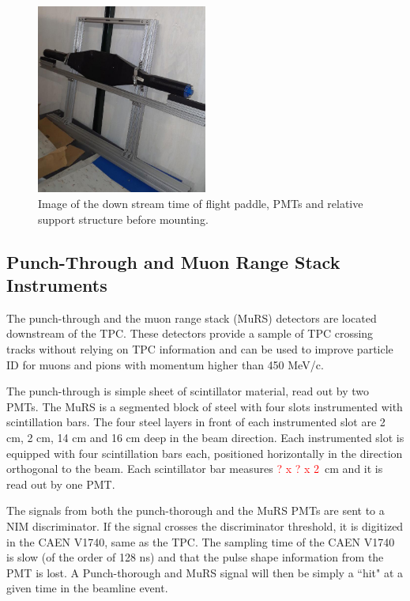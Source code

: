 \begin{figure}[h!]
\centering
\includegraphics[width=0.5\textwidth]{Chapter-3/Images/DSTOF.jpg}
\caption{Image of the down stream time of flight paddle, PMTs and relative support structure before mounting. } 
\label{fig:TOF}
\end{figure}




\subsection{Punch-Through and Muon Range Stack Instruments}\label{sec:MuRS}

The punch-through and the muon range stack (MuRS) detectors are located downstream of the TPC. These detectors provide a sample of  TPC crossing tracks without relying on TPC information and can be used to improve particle ID for  muons and pions with momentum higher than  450 MeV/c.

The punch-through is simple sheet of scintillator material, read out by two PMTs. 
The MuRS is a segmented block of steel with four slots instrumented with scintillation bars. The four steel layers in front of each instrumented slot are 2 cm, 2 cm, 14 cm and 16 cm deep in the beam direction. Each instrumented slot is equipped with four scintillation bars each, positioned horizontally in the direction orthogonal to the beam. Each scintillator bar measures  \textcolor{red}{? x ? x 2}~cm and it is read out by one PMT.  

The signals from both the punch-thorough and the MuRS PMTs  are sent to a NIM discriminator. If the signal crosses the discriminator threshold, it is digitized in the CAEN V1740, same as the TPC. The sampling time of the CAEN V1740 is slow (of the order of 128 ns) and that the pulse shape information from the PMT is lost. A Punch-thorough and MuRS signal will then be simply a ``hit" at a given time in the beamline event.



